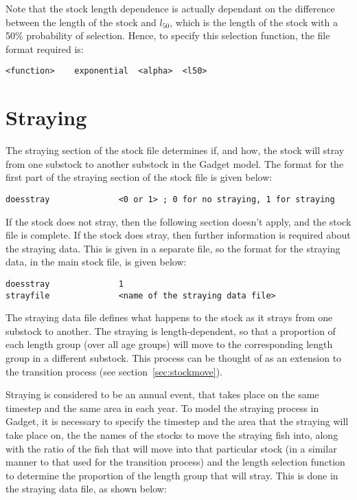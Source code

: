 \documentclass[10pt,twoside]{book}
\begin{document}
\bigskip
Note that the stock length dependence is actually dependant on the difference between the length of the stock and $l_{50}$, which is the length of the stock with a 50\% probability of selection.  Hence, to specify this selection function, the file format required is:

{\small\begin{verbatim}
<function>    exponential  <alpha>  <l50>
\end{verbatim}}

\section{Straying}\label{sec:stockstray}
The straying section of the stock file determines if, and how, the stock will stray from one substock to another substock in the Gadget model.  The format for the first part of the straying section of the stock file is given below:

{\small\begin{verbatim}
doesstray              <0 or 1> ; 0 for no straying, 1 for straying
\end{verbatim}}

If the stock does not stray, then the following section doesn't apply, and the stock file is complete.  If the stock does stray, then further information is required about the straying data.  This is given in a separate file, so the format for the straying data, in the main stock file, is given below:

{\small\begin{verbatim}
doesstray              1
strayfile              <name of the straying data file>
\end{verbatim}}

The straying data file defines what happens to the stock as it strays from one substock to another.  The straying is length-dependent, so that a proportion of each length group (over all age groups) will move to the corresponding length group in a different substock.  This process can be thought of as an extension to the transition process (see section~\ref{sec:stockmove}).

\bigskip
Straying is considered to be an annual event, that takes place on the same timestep and the same area in each year.  To model the straying process in Gadget, it is necessary to specify the timestep and the area that the straying will take place on, the the names of the stocks to move the straying fish into, along with the ratio of the fish that will move into that particular stock (in a similar manner to that used for the transition process) and the length selection function to determine the proportion of the length group that will stray.  This is done in the straying data file, as shown below:
\end{document}
